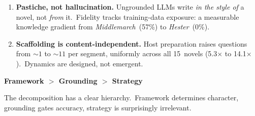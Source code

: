 \documentclass[landscape]{article}
\newcommand{\bodysize}{\fontsize{20}{26}\selectfont}
\newcommand{\smallbody}{\fontsize{18}{23}\selectfont}
\begin{document}
\begin{minipage}[t]{0.295\textwidth}
\begin{tcolorbox}[posterbox]
\begin{enumerate}[leftmargin=*, labelsep=6pt, itemsep=6pt,
  label={\sffamily\bfseries\color{white}\protect\colorbox{burgundy}{\arabic*}}]
  \item \bodysize\textbf{\color{teal}Pastiche, not hallucination.}
    Ungrounded LLMs write \textit{in the style of} a novel, not
    \textit{from} it.\ Fidelity tracks training-data exposure: a
    measurable knowledge gradient from \textit{Middlemarch}~(57\%) to
    \textit{Hester}~(0\%).

  \item \bodysize\textbf{\color{gold}Scaffolding is content-independent.}
    Host preparation raises questions from ${\sim}1$ to ${\sim}11$ per
    segment, uniformly across all 15~novels (5.3$\times$ to
    14.1$\times$).\ Dynamics are designed, not emergent.
\end{enumerate}

\vspace{6pt}
\begin{tcolorbox}[enhanced, colback=burgundy!5, colframe=burgundy!15,
  boxrule=0.5pt, arc=3pt, left=8pt, right=8pt, top=6pt, bottom=6pt]
  {\sffamily\bfseries\fontsize{20}{24}\selectfont\color{burgundy}%
    Framework $>$ Grounding $>$ Strategy}\par
  \smallbody The decomposition has a clear hierarchy.\ Framework
  determines character, grounding gates accuracy, strategy is
  surprisingly irrelevant.
\end{tcolorbox}
\end{tcolorbox}

\end{minipage}
\end{document}

